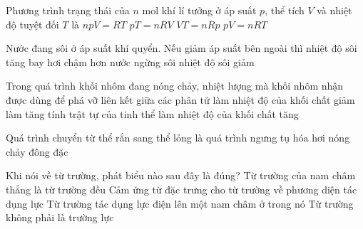 	\begin{ex}%
		Phương trình trạng thái của $n$ mol khí lí tưởng ở áp suất $p$, thể tích $V$ và nhiệt độ tuyệt đối $T$ là
		\choice
		{$npV=RT$}
		{$pT=nRV$}
		{$VT=nRp$}
		{\True $pV=nRT$}
	\end{ex}

	\begin{ex}%
		Nước đang sôi ở áp suất khí quyển. Nếu giảm áp suất bên ngoài thì
		\choice
		{nhiệt độ sôi tăng}
		{bay hơi chậm hơn}
		{nước ngừng sôi}
		{\True nhiệt độ sôi giảm}
	\end{ex}

	\begin{ex}%
		Trong quá trình khối nhôm đang nóng chảy, nhiệt lượng mà khối nhôm nhận được dùng để
		\choice
		{\True phá vỡ liên kết giữa các phân tử}
		{làm nhiệt độ của khối chất giảm}
		{làm tăng tính trật tự của tinh thể}
		{làm nhiệt độ của khối chất tăng}
	\end{ex}

	\begin{ex}%
		Quá trình chuyển từ thể rắn sang thể lỏng là quá trình
		\choice
		{ngưng tụ}
		{hóa hơi}
		{\True nóng chảy}
		{đông đặc}
	\end{ex}

	\begin{ex}%
		Khi nói về từ trường, phát biểu nào sau đây là đúng?
		\choice
		{Từ trường của nam châm thẳng là từ trường đều}
		{\True Cảm ứng từ đặc trưng cho từ trường về phương diện tác dụng lực}
		{Từ trường tác dụng lực điện lên một nam châm ở trong nó}
		{Từ trường không phải là trường lực}
	\end{ex}

